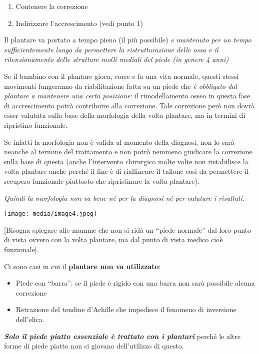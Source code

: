 \documentclass[]{article}
\begin{document}
\begin{enumerate}
\def\labelenumi{\arabic{enumi}.}
\item
  Contenere la correzione
\item
  Indirizzare l'accrescimento (vedi punto 1)
\end{enumerate}

Il plantare va portato a tempo pieno (il più possibile) \emph{e
mantenuto per un tempo sufficientemente lungo da permettere la
ristrutturazione delle ossa e il ritensionamento delle strutture molli
mediali del piede (in genere 4 anni)}

Se il bambino con il plantare gioca, corre e fa una vita normale, questi
stessi movimenti fungeranno da riabilitazione fatta su un piede che
\emph{è obbligato dal plantare a mantenere una certa posizione}: il
rimodellamento osseo in questa fase di accrescimento potrà contribuire
alla correzione. Tale correzione però non dovrà esser valutata sulla
base della morfologia della volta plantare, ma in termini di ripristino
funzionale.

Se infatti la morfologia non è valida al momento della diagnosi, non lo
sarà neanche al termine del trattamento e non potrò nemmeno giudicare la
correzione sulla base di questa (anche l'intervento chirurgico molte
volte non ristabilisce la volta plantare anche perché il fine è di
riallineare il tallone così da permettere il recupero funzionale
piuttosto che ripristinare la volta plantare).

\emph{Quindi la morfologia non va bene né per la diagnosi né per
valutare i risultati}.

\texttt{[image: media/image4.jpeg]}

{[}Bisogna spiegare alle mamme che non si ridà un ``piede normale'' dal
loro punto di vista ovvero con la volta plantare, ma dal punto di vista
medico cioè funzionale{]}.

Ci sono casi in cui il \textbf{plantare non va utilizzato}:

\begin{itemize}
\item
  Piede con ``barra'': se il piede è rigido con una barra non sarà
  possibile alcuna correzione
\item
  Retrazione del tendine d'Achille che impedisce il fenomeno di
  inversione dell'elica.
\end{itemize}

\textbf{\emph{Solo il piede piatto essenziale è trattato con i
plantari}} perché le altre forme di piede piatto non si giovano
dell'utilizzo di questo.
\end{document}
